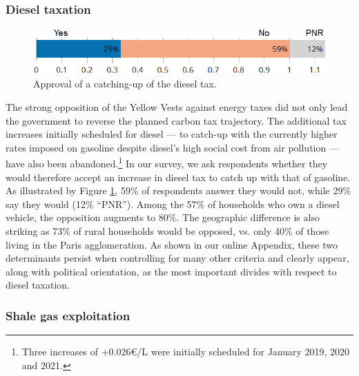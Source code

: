 \documentclass[english,5p,authoryear]{elsarticle}
\begin{document}
        \subsubsection{Diesel taxation}

\begin{figure}[b]
\centering
\includegraphics[width=0.9\columnwidth]{Images/diesel_catch_up_trim.png}
\caption{Approval of a catching-up of the diesel tax.}
\label{fig:diesel}
\end{figure}
The strong opposition of the Yellow Vests against energy taxes did not only lead the government to reverse the planned carbon tax trajectory. The additional tax increases initially scheduled for diesel --- to catch-up with the currently higher rates imposed on gasoline despite diesel's high social cost from air pollution  --- have also been abandoned.\footnote{Three increases of +0.026\euro{}/L were initially scheduled for January 2019, 2020 and 2021.}  In our survey, we ask respondents whether they would therefore accept an increase in diesel tax to catch up with that of gasoline. As illustrated by Figure \ref{fig:diesel}, 59\% of respondents answer they would not, while 29\% say they would (12\% ``PNR''). Among the 57\% of households who own a diesel vehicle, the opposition augments to 80\%. The geographic difference is also striking as 73\% of rural households would be opposed, vs. only 40\% of those living in the Paris agglomeration. As shown in our online Appendix, these two determinants persist when controlling for many other criteria and clearly appear, along with political orientation, as the most important divides with respect to diesel taxation.


        \subsubsection{Shale gas exploitation}
\end{document}
